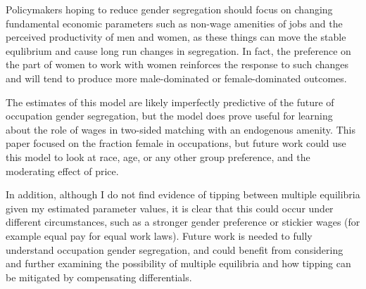 \documentclass[11pt]{article}
\begin{document}

Policymakers hoping to reduce gender segregation should focus on changing fundamental economic parameters such as non-wage amenities of jobs and the perceived productivity of men and women, as these things can move the stable equlibrium and cause long run changes in segregation. In fact, the preference on the part of women to work with women reinforces the response to such changes and will tend to produce more male-dominated or female-dominated outcomes.



The estimates of this model are likely imperfectly predictive of the future of occupation gender segregation, but the model does prove useful for learning about the role of wages in two-sided matching with an endogenous amenity. This paper focused on the fraction female in occupations, but future work could use this model to look at race, age, or any other group preference, and the moderating effect of price.

In addition, although I do not find evidence of tipping between multiple equilibria given my estimated parameter values, it is clear that this could occur under different circumstances, such as a stronger gender preference or stickier wages (for example equal pay for equal work laws). Future work is needed to fully understand occupation gender segregation, and could benefit from considering and further examining the possibility of multiple equilibria and how tipping can be mitigated by compensating differentials.


\end{document}
